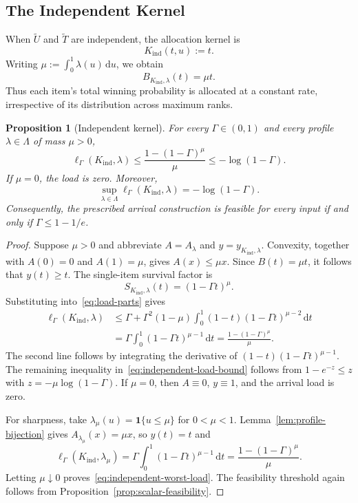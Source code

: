 \documentclass[11pt]{article}
\newtheorem{proposition}[theorem]{Proposition}
\theoremstyle{definition}
\theoremstyle{remark}
\newcommand{\dd}{\,\mathrm d}
\newcommand{\ind}{\mathbf 1}
\begin{document}
\subsection{The Independent Kernel}\label{sec:independent}

When $\widetilde U$ and $\widetilde T$ are independent, the allocation kernel is
\begin{equation}\label{eq:independent-kernel}
 K_{\mathrm{ind}}(t,u):=t.
\end{equation}
Writing $\mu:=\int_0^1\lambda(u)\dd u$, we obtain
\begin{equation}\label{eq:independent-allocation}
 B_{K_{\mathrm{ind}},\lambda}(t)=\mu t.
\end{equation}
Thus each item's total winning probability is allocated at a constant rate, irrespective of its distribution across maximum ranks.

\begin{proposition}[Independent kernel]\label{prop:independent}
For every $\Gamma\in(0,1)$ and every profile $\lambda\in\Lambda$ of mass $\mu>0$,
\begin{equation}\label{eq:independent-load-bound}
 \ell_\Gamma(K_{\mathrm{ind}},\lambda)
 \le\frac{1-(1-\Gamma)^\mu}{\mu}
 \le-\log(1-\Gamma).
\end{equation}
If $\mu=0$, the load is zero.
Moreover,
\begin{equation}\label{eq:independent-worst-load}
 \sup_{\lambda\in\Lambda}\ell_\Gamma(K_{\mathrm{ind}},\lambda)
 =-\log(1-\Gamma).
\end{equation}
Consequently, the prescribed arrival construction is feasible for every input if and only if $\Gamma\le1-1/e$.
\end{proposition}
\begin{proof}
Suppose $\mu>0$ and abbreviate $A=A_\lambda$ and $y=y_{K_{\mathrm{ind}},\lambda}$.
Convexity, together with $A(0)=0$ and $A(1)=\mu$, gives $A(x)\le\mu x$.
Since $B(t)=\mu t$, it follows that $y(t)\ge t$.
The single-item survival factor is
\[
 S_{K_{\mathrm{ind}},\lambda}(t)=(1-\Gamma t)^\mu.
\]
Substituting into~\eqref{eq:load-parts} gives
\begin{align*}
 \ell_\Gamma(K_{\mathrm{ind}},\lambda)
 &\le\Gamma+\Gamma^2(1-\mu)
       \int_0^1(1-t)(1-\Gamma t)^{\mu-2}\dd t\\
 &=\Gamma\int_0^1(1-\Gamma t)^{\mu-1}\dd t
 =\frac{1-(1-\Gamma)^\mu}{\mu}.
\end{align*}
The second line follows by integrating the derivative of
$(1-t)(1-\Gamma t)^{\mu-1}$.
The remaining inequality in~\eqref{eq:independent-load-bound} follows from $1-e^{-z}\le z$ with $z=-\mu\log(1-\Gamma)$.
If $\mu=0$, then $A\equiv0$, $y\equiv1$, and the arrival load is zero.

For sharpness, take $\lambda_\mu(u)=\ind\{u\le\mu\}$ for $0<\mu<1$.
Lemma~\ref{lem:profile-bijection} gives $A_{\lambda_\mu}(x)=\mu x$, so $y(t)=t$ and
\[
 \ell_\Gamma(K_{\mathrm{ind}},\lambda_\mu)
 =\Gamma\int_0^1(1-\Gamma t)^{\mu-1}\dd t
 =\frac{1-(1-\Gamma)^\mu}{\mu}.
\]
Letting $\mu\downarrow0$ proves~\eqref{eq:independent-worst-load}.
The feasibility threshold again follows from Proposition~\ref{prop:scalar-feasibility}.
\end{proof}
\end{document}
